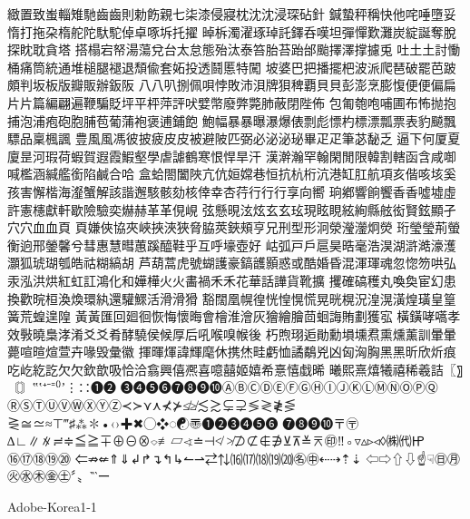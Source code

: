 緻置致蚩輜雉馳⿒齒則勅飭親七柒漆侵寢枕沈沈浸琛砧針
鍼蟄秤稱快他咤唾墮妥惰打拖朶楕舵陀馱駝倬卓啄坼托擢
晫柝濁濯琢琸託鐸呑嘆坦彈憚歎灘炭綻誕奪脫探眈耽貪塔
搭榻宕帑湯蕩兌台太怠態殆汰泰笞胎苔跆邰颱擇澤撑攄兎
吐⼟土討慟桶痛筒統通堆槌腿褪退頹偸套妬投透鬪慝特闖
坡婆巴把播擺杷波派爬琶破罷芭跛頗判坂板版瓣販辦鈑阪
⼋八叭捌佩唄悖敗沛浿牌狽稗覇⾙貝彭澎烹膨愎便便偏扁
⽚片篇編翩遍鞭騙貶坪平枰萍評吠嬖幣廢弊斃肺蔽閉陛佈
包匍匏咆哺圃布怖抛抱捕泡浦疱砲胞脯苞葡蒲袍褒逋鋪飽
鮑幅暴暴曝瀑爆俵剽彪慓杓標漂瓢票表豹飇飄驃品稟楓諷
豊⾵風馮彼披疲⽪皮被避陂匹弼必泌泌珌畢⽦疋筆苾馝乏
逼下何厦夏廈昰河瑕荷蝦賀遐霞鰕壑學虐謔鶴寒恨悍旱汗
漢澣瀚罕翰閑閒限韓割轄函含咸啣喊檻涵緘艦銜陷鹹合哈
盒蛤閤闔陜亢伉姮嫦巷恒抗杭桁沆港缸肛航項亥偕咳垓奚
孩害懈楷海瀣蟹解該諧邂駭骸劾核倖幸杏荇⾏行行享向嚮
珦鄕響餉饗⾹香噓墟虛許憲櫶獻軒歇險驗奕爀赫⾰革俔峴
弦懸晛泫炫⽞玄玹現眩睍絃絢縣舷衒賢鉉顯孑⽳穴⾎血⾴
頁嫌俠協夾峽挾浹狹脅脇莢鋏頰亨兄刑型形泂滎瀅灐炯熒
珩瑩瑩荊螢衡逈邢鎣馨兮彗惠慧暳蕙蹊醯鞋乎互呼壕壺好
岵弧⼾戶扈昊晧毫浩淏湖滸澔濠濩灝狐琥瑚瓠皓祜糊縞胡
芦葫蒿虎號蝴護豪鎬頀顥惑或酷婚昏混渾琿魂忽惚笏哄弘
汞泓洪烘紅虹訌鴻化和嬅樺⽕火畵禍⽲禾花華話譁貨靴擴
攫確碻穫丸喚奐宦幻患換歡晥桓渙煥環紈還驩鰥活滑滑猾
豁闊凰幌徨恍惶愰慌晃晄榥況湟滉潢煌璜皇篁簧荒蝗遑隍
⿈黃匯回廻徊恢悔懷晦會檜淮澮灰獪繪膾茴蛔誨賄劃獲宖
橫鐄哮嚆孝效斅曉梟涍淆⽘爻肴酵驍侯候厚后吼喉嗅帿後
朽煦珝逅勛勳塤壎焄熏燻薰訓暈暈薨喧暄煊萱卉喙毁彙徽
揮暉煇諱輝麾休携烋畦虧恤譎鷸兇凶匈洶胸⿊黑昕欣炘痕
吃屹紇訖⽋欠欽歆吸恰洽翕興僖凞喜噫囍姬嬉希憙憘戱晞
曦熙熹熺犧禧稀羲詰〖〗〘〙‟‛⁺⁻⁼⁽⁾ʼ⋮∷➊➋
➌➍➎➏➐➑➒➓ⒶⒷⒸⒹⒺⒻⒼⒽⒾⒿⓀⓁⓂⓃⓄⓅⓆ
ⓇⓈⓉⓊⓋⓌⓍⓎⓏ≺≻⋎⋏⊀⊁≰≱≲≳⊊⊋≶≷≹⋚
⋛≅≃≈⊤‴♯⁂✽•‹›✚✖◯❖◌☯〠❶❷❸❹❺❻
❼❽❾❿〒〶∆∟∥∦≓≑≦≧∓⊕⊖⊗⌔≢▱∢≐⊣≮
≯⊅⊄∉∌⊻⊼≚⌆㊞‼◦▿▵▹◃◊㈱㈹㏋⑯⑰⑱⑲⑳
⇐⇏⇍⇑⇓↲↱↴↰↳↼⇀⇄⇅⒃⒄⒅⒆⒇㊔㊥⇠⇢⇡⇣
⇦⇨⇧⇩☝☟㊐㊊㊋㊌㊍㊎㊏〞〟‶‵ー

Adobe-Korea1-1

